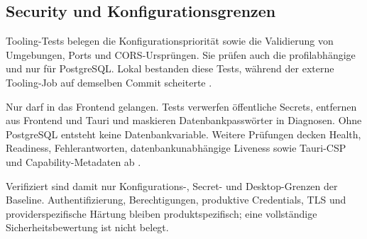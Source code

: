\subsection{Security und Konfigurationsgrenzen}
\label{subsec:security-konfigurationsgrenzen}

Tooling-Tests belegen die Konfigurationspriorität sowie die Validierung von
Umgebungen, Ports und CORS-Ursprüngen. Sie prüfen auch die profilabhängige
 und  nur für PostgreSQL. Lokal bestanden
diese Tests, während der externe Tooling-Job auf demselben Commit scheiterte
\parencite{kleiveist2026configuration,kleiveist2026ci-core-run}.

Nur  darf in das Frontend gelangen. Tests verwerfen
öffentliche Secrets, entfernen  aus Frontend und Tauri und
maskieren Datenbankpasswörter in Diagnosen. Ohne PostgreSQL entsteht keine
Datenbankvariable. Weitere Prüfungen decken Health, Readiness,
Fehlerantworten, datenbankunabhängige Liveness sowie Tauri-CSP und
Capability-Metadaten ab
\parencite{kleiveist2026acceptance,kleiveist2026release}.

Verifiziert sind damit nur Konfigurations-, Secret- und Desktop-Grenzen der
Baseline. Authentifizierung, Berechtigungen, produktive Credentials, TLS und
providerspezifische Härtung bleiben produktspezifisch; eine vollständige
Sicherheitsbewertung ist nicht belegt.
